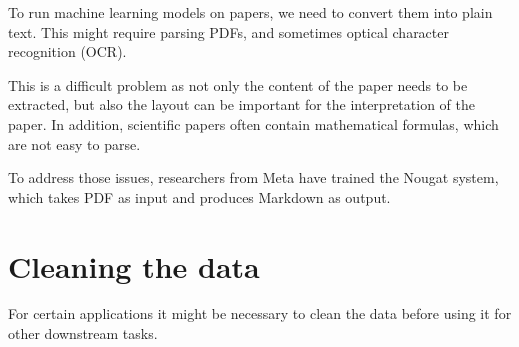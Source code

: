 \documentclass[
  letterpaper,
  DIV=11,
  numbers=noendperiod]{scrreprt}
\begin{document}
To run machine learning models on papers, we need to convert them into
plain text. This might require parsing PDFs, and sometimes optical
character recognition (OCR).

This is a difficult problem as not only the content of the paper needs
to be extracted, but also the layout can be important for the
interpretation of the paper. In addition, scientific papers often
contain mathematical formulas, which are not easy to parse.

To address those issues, researchers from Meta have trained the Nougat
system, which takes PDF as input and produces Markdown as output.

\hypertarget{cleaning-the-data}{%
\section{Cleaning the data}\label{cleaning-the-data}}

For certain applications it might be necessary to clean the data before
using it for other downstream tasks.
\end{document}
